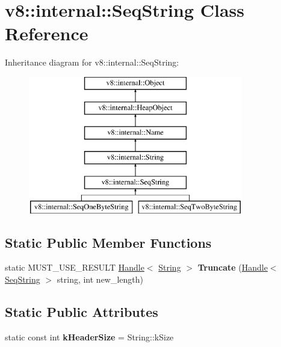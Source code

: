 \hypertarget{classv8_1_1internal_1_1_seq_string}{}\section{v8\+:\+:internal\+:\+:Seq\+String Class Reference}
\label{classv8_1_1internal_1_1_seq_string}
Inheritance diagram for v8\+:\+:internal\+:\+:Seq\+String\+:\begin{figure}[H]
\begin{center}
\leavevmode
\includegraphics[height=6.000000cm]{classv8_1_1internal_1_1_seq_string}
\end{center}
\end{figure}
\subsection*{Static Public Member Functions}
\begin{DoxyCompactItemize}
\item 
static M\+U\+S\+T\+\_\+\+U\+S\+E\+\_\+\+R\+E\+S\+U\+LT \hyperlink{classv8_1_1internal_1_1_handle}{Handle}$<$ \hyperlink{classv8_1_1internal_1_1_string}{String} $>$ {\bfseries Truncate} (\hyperlink{classv8_1_1internal_1_1_handle}{Handle}$<$ \hyperlink{classv8_1_1internal_1_1_seq_string}{Seq\+String} $>$ string, int new\+\_\+length)\hypertarget{classv8_1_1internal_1_1_seq_string_a458de3667396155cbc7b3e5e89ea9774}{}\label{classv8_1_1internal_1_1_seq_string_a458de3667396155cbc7b3e5e89ea9774}

\end{DoxyCompactItemize}
\subsection*{Static Public Attributes}
\begin{DoxyCompactItemize}
\item 
static const int {\bfseries k\+Header\+Size} = String\+::k\+Size\hypertarget{classv8_1_1internal_1_1_seq_string_a2c2ba2c9718ba1841132c6b9c32ada47}{}\label{classv8_1_1internal_1_1_seq_string_a2c2ba2c9718ba1841132c6b9c32ada47}

\end{DoxyCompactItemize}

